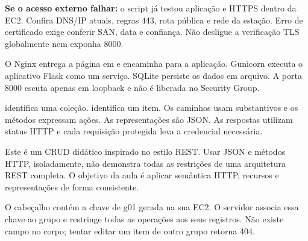 \textbf{Se o acesso externo falhar:} o script já testou aplicação e HTTPS dentro da EC2. Confira DNS/IP atuais, regras 443, rota pública e rede da estação. Erro de certificado exige conferir SAN, data e confiança. Não desligue a verificação TLS globalmente nem exponha 8000.


\begin{center}
\end{center}
O Nginx entrega a página em \cmd{/} e encaminha  para a aplicação. Gunicorn executa o aplicativo Flask como um serviço. SQLite persiste os dados em arquivo. A porta 8000 escuta apenas em loopback e não é liberada no Security Group.

 identifica uma coleção.  identifica um item. Os caminhos usam substantivos e os métodos expressam ações. As representações são JSON. As respostas utilizam status HTTP e cada requisição protegida leva a credencial necessária.

Este é um CRUD didático inspirado no estilo REST. Usar JSON e métodos HTTP, isoladamente, não demonstra todas as restrições de uma arquitetura REST completa. O objetivo da aula é aplicar semântica HTTP, recursos e representações de forma consistente.

O cabeçalho  contém a chave de g01 gerada na sua EC2. O servidor associa essa chave ao grupo e restringe todas as operações aos seus registros. Não existe campo  no corpo; tentar editar um item de outro grupo retorna 404.

